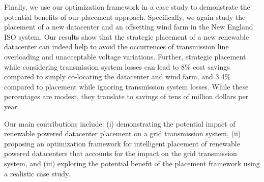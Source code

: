 Finally, we use our optimization framework in a case study to demonstrate the potential benefits of our placement approach.  Specifically, we again study the placement of a new datacenter and an offsetting wind farm in the New England ISO system.  Our results show that the strategic placement of a new renewable datacenter can indeed help to avoid the occurrences of transmission line overloading and unacceptable voltage variations.  Further, strategic placement while considering transmission system losses can lead to 8\% cost savings compared to simply co-locating the datacenter and wind farm, and 3.4\% compared to placement while ignoring transmission system losses.  While these percentages are modest, they translate to savings of tens of million dollars per year.


 Our main contributions include: (i) demonstrating the potential impact of renewable powered datacenter placement on a grid transmission system, (ii) proposing an optimization framework for intelligent placement of renewable powered datacenters that accounts for the impact on the grid transmission system, and (iii) exploring the potential benefit of the placement framework using a realistic case study.

